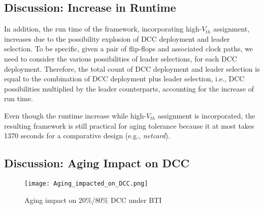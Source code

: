 

\subsection{Discussion: Increase in Runtime}
In addition, the run time of the framework, incorporating high-$V_{th}$ assignment, increases due to the possibility explosion of DCC deployment and leader selection. To be specific, given a pair of flip-flops and associated clock paths, we need to consider the various possibilities of leader selections, for each DCC deployment. Therefore, the total  count of DCC deployment and leader selection is equal to the combination of DCC deployment plus leader selection, i.e., DCC possibilities multiplied by the leader counterparts, accounting for the increase of run time. 

Even though the runtime increase while high-$V_{th}$ assignment is incorporated, the resulting framework is still practical for aging tolerance because it at most takes 1370 seconds for a comparative design (e.g., \textit{netcard}).
\subsection{Discussion: Aging Impact on DCC}
\begin{figure}
    \centering
     \texttt{[image: Aging\_impacted\_on\_DCC.png]} %
    \caption{Aging impact on 20\%/80\% DCC under BTI}
    \label{fig:exp4}
\end{figure}

